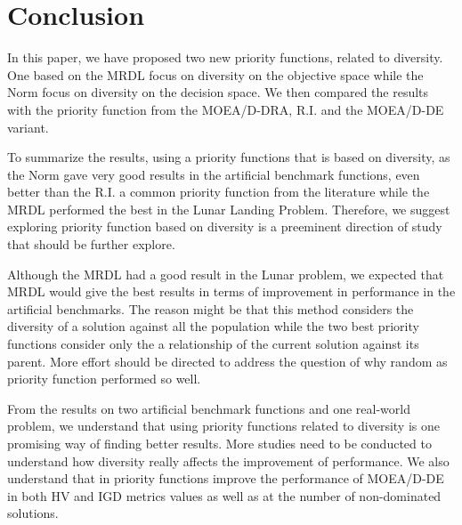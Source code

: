 \section{Conclusion}

In this paper, we have proposed two new priority functions, related to diversity. One based on the MRDL focus on diversity on the objective space while the Norm focus on diversity on the decision space. We then compared the results with the priority function from the MOEA/D-DRA, R.I. and the MOEA/D-DE variant. 

To summarize the results, using a priority functions that is based on diversity, as the Norm gave very good results in the artificial benchmark functions, even better than the R.I. a common priority function from the literature while the MRDL performed the best in the Lunar Landing Problem. Therefore, we suggest exploring priority function based on diversity is a preeminent direction of study that should be further explore. 

Although the MRDL had a good result in the Lunar problem, we expected that MRDL would give the best results in terms of improvement in performance in the artificial benchmarks. The reason might be that this method considers the diversity of a solution against all the population while the two best priority functions consider only the a relationship of the current solution against its parent. More effort should be directed to address the question of why random as priority function performed so well.

From the results on two artificial benchmark functions and one real-world problem, we understand that using priority functions related to diversity is one promising way of finding better results. More studies need to be conducted to understand how diversity really affects the improvement of performance. We also understand that in priority functions improve the performance of MOEA/D-DE in both HV and IGD metrics values as well as at the number of non-dominated solutions.%


